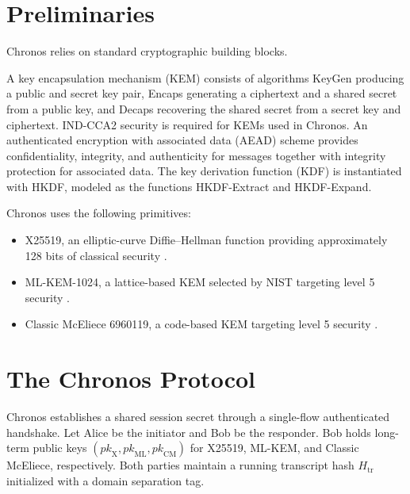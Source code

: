 \documentclass[runningheads]{llncs}
\begin{document}
\section{Preliminaries}
Chronos relies on standard cryptographic building blocks.

A key encapsulation mechanism (KEM) consists of algorithms \textsf{KeyGen} producing a public and secret key pair, \textsf{Encaps} generating a ciphertext and a shared secret from a public key, and \textsf{Decaps} recovering the shared secret from a secret key and ciphertext. IND-CCA2 security is required for KEMs used in Chronos. An authenticated encryption with associated data (AEAD) scheme provides confidentiality, integrity, and authenticity for messages together with integrity protection for associated data. The key derivation function (KDF) is instantiated with HKDF, modeled as the functions \textsf{HKDF-Extract} and \textsf{HKDF-Expand}.

Chronos uses the following primitives:
\begin{itemize}
  \item X25519, an elliptic-curve Diffie--Hellman function providing approximately 128 bits of classical security \cite{bernstein2006curve25519}.
  \item ML-KEM-1024, a lattice-based KEM selected by NIST targeting level 5 security \cite{bos2020crystalskyber}.
  \item Classic McEliece 6960119, a code-based KEM targeting level 5 security \cite{bernstein2020classicmceliece}.
\end{itemize}

\section{The Chronos Protocol}
Chronos establishes a shared session secret through a single-flow authenticated handshake. Let Alice be the initiator and Bob be the responder. Bob holds long-term public keys \((\mathit{pk}_\mathrm{X}, \mathit{pk}_\mathrm{ML}, \mathit{pk}_\mathrm{CM})\) for X25519, ML-KEM, and Classic McEliece, respectively. Both parties maintain a running transcript hash \(H_\mathrm{tr}\) initialized with a domain separation tag.
\end{document}
